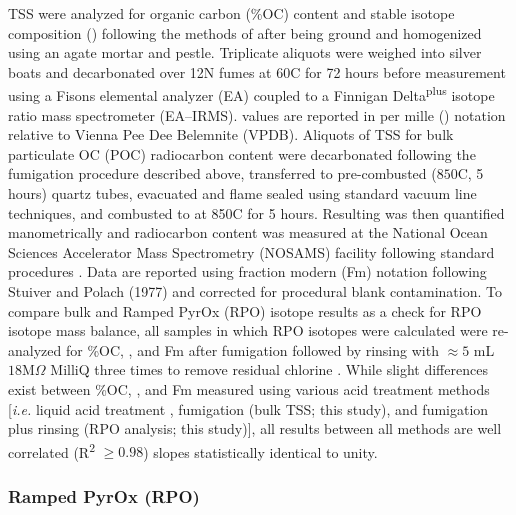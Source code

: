 TSS were analyzed for organic carbon (\%OC) content and stable isotope composition () following the methods of \citet{Whiteside:2011jea} after being ground and homogenized using an agate mortar and pestle. Triplicate aliquots were weighed into silver boats and decarbonated over 12N  fumes at $60$\textdegree C for 72 hours before measurement using a Fisons elemental analyzer (EA) coupled to a Finnigan Delta\textsuperscript{plus} isotope ratio mass spectrometer (EA--IRMS).  values are reported in per mille (\textperthousand) notation relative to Vienna Pee Dee Belemnite (VPDB). Aliquots of TSS for bulk particulate OC (POC) radiocarbon content were decarbonated following the fumigation procedure described above, transferred to pre-combusted ($850$\textdegree C, 5 hours) quartz tubes, evacuated and flame sealed using standard vacuum line techniques, and combusted to  at 850\textdegree C for 5 hours. Resulting  was then quantified manometrically and radiocarbon content was measured at the National Ocean Sciences Accelerator Mass Spectrometry (NOSAMS) facility following standard procedures \citep{McNichol:1994ty,Pearson:1998vy}. Data are reported using fraction modern (Fm) notation following Stuiver and Polach (1977) and corrected for procedural blank contamination. To compare bulk and Ramped PyrOx (RPO) isotope results as a check for RPO isotope mass balance, all samples in which RPO isotopes were calculated were re-analyzed for \%OC, , and Fm after fumigation followed by rinsing with $\approx 5$ mL $18$M$\Omega$ MilliQ  three times to remove residual chlorine \citep{Hemingway:2016bq}. While slight differences exist between \%OC, , and Fm measured using various acid treatment methods [\textit{i.e.} liquid acid treatment \citep[bulk soils;][]{Hilton:2010cg,Hilton:2013kq}, fumigation (bulk TSS; this study), and fumigation plus rinsing (RPO analysis; this study)], all results between all methods are well correlated (R\textsuperscript{2} $\geq 0.98$) slopes statistically identical to unity.

\subsubsection{Ramped PyrOx (RPO)}

